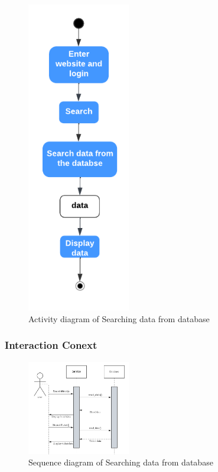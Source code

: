 \documentclass[conference]{IEEEtran}
\begin{document}
\begin{figure}[htbp]
	\centerline{\includegraphics[width=0.4\textwidth]{image/searching hotel activity1.pdf}}
	\caption{Activity diagram of Searching data from database }
	\label{activity1}
\end{figure}


\subsubsection{\textbf{Interaction Conext }}

\begin{figure}[htbp]
	\centerline{\includegraphics[width=0.4\textwidth]{image/searching hotel sequence1.pdf}}
	\caption{Sequence diagram of Searching data from database }
	\label{sequence1}
\end{figure}
\end{document}

